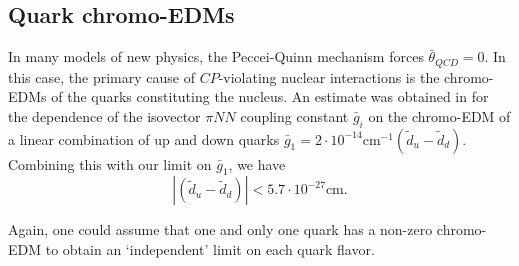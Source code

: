 \documentclass [10pt, twoside] {uwthesis}[2012/04/02]
\begin{document}
\subsection{Quark chromo-EDMs}
In many models of new physics, the Peccei-Quinn mechanism forces $\bar{\theta}_{QCD} = 0$. In this case, the primary cause of $CP$-violating nuclear interactions is the chromo-EDMs of the quarks constituting the nucleus. An estimate was obtained in \cite{2002_Pospelov_quark_chromo_EDM} for the dependence of the isovector $\pi NN$ coupling constant $\bar{g}_{i}$ on the chromo-EDM of a linear combination of up and down quarks $\bar{g}_1=2\cdot10^{-14}\text{cm}^{-1}(\widetilde{d}_u-\widetilde{d}_d)$. Combining this with our limit on $\bar{g}_1$, we have
\begin{equation}
|(\widetilde{d}_u-\widetilde{d}_d)| < 5.7 \cdot 10^{-27} \text{cm}.
\end{equation}

Again, one could assume that one and only one quark has a non-zero chromo-EDM to obtain an `independent' limit on each quark flavor. 
\end{document}
